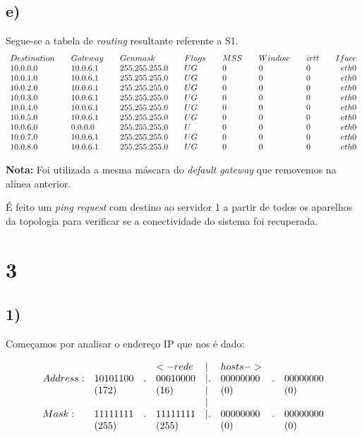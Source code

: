 \documentclass{llncs}
\begin{document}
\subsection*{e)}

Segue-se a tabela de \textit{routing} resultante referente a S1.
\[
\begin{array}{l l l l l l l l l l l l l l r }
Destination  && Gateway    &&   Genmask      && Flags &&MSS&& Window&&irtt&&Iface \\
10.0.0.0     && 10.0.6.1   &&   255.255.255.0&& UG    &&  0&& 0     &&   0&&eth0 \\
10.0.1.0     && 10.0.6.1   &&   255.255.255.0&& UG    &&  0&& 0     &&   0&&eth0 \\
10.0.2.0     && 10.0.6.1   &&   255.255.255.0&& UG    &&  0&& 0     &&   0&&eth0 \\
10.0.3.0     && 10.0.6.1   &&   255.255.255.0&& UG    &&  0&& 0     &&   0&&eth0 \\
10.0.4.0     && 10.0.6.1   &&   255.255.255.0&& UG    &&  0&& 0     &&   0&&eth0 \\
10.0.5.0     && 10.0.6.1   &&   255.255.255.0&& UG    &&  0&& 0     &&   0&&eth0 \\
10.0.6.0     && 0.0.0.0    &&   255.255.255.0&& U     &&  0&& 0     &&   0&&eth0 \\
10.0.7.0     && 10.0.6.1   &&   255.255.255.0&& UG    &&  0&& 0     &&   0&&eth0 \\
10.0.8.0     && 10.0.6.1   &&   255.255.255.0&& UG    &&  0&& 0     &&   0&&eth0
\end{array}
\]

\textbf{Nota:} Foi utilizada a mesma máscara do \textit{default gateway} que removemos na alínea anterior.

É feito um \textit{ping request} com destino ao servidor 1 a partir de todos os aparelhos da topologia para verificar se a conectividade do sistema foi recuperada.

\section*{3}

\subsection*{1)}

Começamos por analisar o endereço IP que nos é dado:

\[
\begin{array}{l l l l l l l l l l l}
&&&<-rede&|&hosts-> \\
Address:& 10101100&.&00010000&|.&00000000&.&00000000\\
& (172)&&(16)&|&(0)&&(0)\\

&&&&|&&\\
Mask:&11111111&.&11111111&|.&00000000&.&00000000 \\
& (255)&&(255)&&(0)&&(0)
\end{array}
\]
\end{document}

